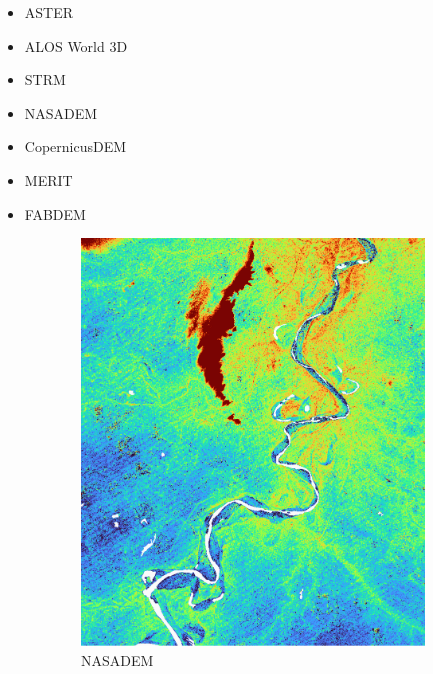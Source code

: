 \begin{itemize}
  \item ASTER
  \item ALOS World 3D
  \item STRM
  \item NASADEM
  \item CopernicusDEM
  \item MERIT
  \item FABDEM
\end{itemize}


\begin{figure}
  \centering
  \begin{subfigure}{0.45\linewidth}
    \includegraphics[width=\linewidth]{nasadem.png}
    \caption{NASADEM}
    \label{fig:nasadem}
  \end{subfigure}
  \hfill
  \begin{subfigure}{0.45\linewidth}

\end{subfigure}
\end{figure}
